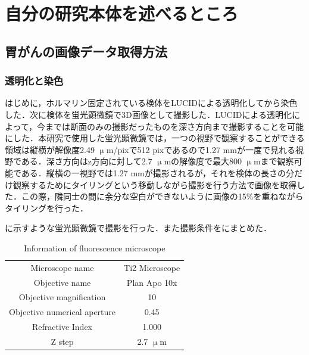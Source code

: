 \chapter{自分の研究本体を述べるところ}

\section{胃がんの画像データ取得方法}

\subsection{透明化と染色}
はじめに，ホルマリン固定されている検体をLUCIDによる透明化してから染色した．次に検体を蛍光顕微鏡で3D画像として撮影した．LUCIDによる透明化によって，今までは断面のみの撮影だったものを深さ方向まで撮影することを可能にした．本研究で使用した蛍光顕微鏡では，一つの視野で観察することができる領域は縦横が解像度2.49 $\upmu$m/pixで512 pixであるので1.27 mmが一度で見れる視野である．深さ方向はz方向に対して2.7 $\upmu$mの解像度で最大800 $\upmu$mまで観察可能である．縦横の一視野では1.27 mmが撮影されるが，それを検体の長さの分だけ観察するためにタイリングという移動しながら撮影を行う方法で画像を取得した．この際，隣同士の間に余分な空白ができないように画像の15\%を重ねながらタイリングを行った．

に示すような蛍光顕微鏡で撮影を行った．また撮影条件をにまとめた．

\begin{table}[H]
	\centering
	\caption{Information of fluorescence microscope}
	\label{tab:蛍光顕微鏡}
	\begin{tabular}{cc}\toprule
		Microscope name & Ti2 Microscope \\ 
		Objective name & Plan Apo 10x \\ 
		Objective magnification & 10 \\ 
		Objective numerical aperture & 0.45 \\ 
		Refractive Index & 1.000 \\
		Z step & 2.7 $\upmu$m \\ \bottomrule
	\end{tabular} 
\end{table}

